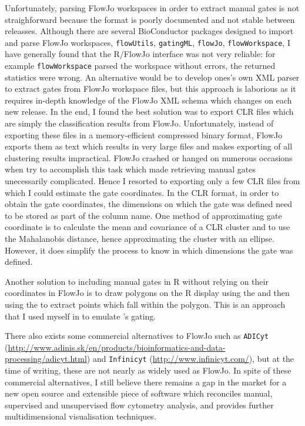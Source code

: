 Unfortunately, parsing FlowJo workspaces in order to extract manual gates is not straighforward because the format is poorly documented and not stable between releasses.
Although there are several BioConductor packages designed to import and parse FlowJo workspaces, \texttt{flowUtils}, \texttt{gatingML}, \texttt{flowJo}, \texttt{flowWorkspace}, I have generally found that the R/FlowJo interface was not very reliable: for example \texttt{flowWorkspace} parsed the workspace without errors, the returned statistics were wrong.
An alternative would be to develop ones's own XML parser to extract gates from FlowJo workspace files, but this approach is laborious as it requires in-depth knowledge of the FlowJo XML schema which changes on each new release.
In the end, I found the best solution was to export CLR files which are simply the classification results from FlowJo.
Unfortunately, instead of exporting these files in a memory-efficient compressed binary format, FlowJo exports them as text which results in very large files and makes exporting of all clustering results impractical. 
FlowJo crashed or hanged on numerous occasions when try to accomplish this task which made retrieving manual gates unecessarily complicated.
Hence I resorted to exporting only a few CLR files from which I could estimate the gate coordinates.
In the CLR format, in order to obtain the gate coordinates, the dimensions on which the gate was defined need to be stored as part of the column name.
One method of approximating gate coordinate is to calculate the mean and covariance of a CLR cluster and to use the Mahalanobis distance, hence approximating the cluster with an ellipse.
However, it does simplify the process to know in which dimensions the gate was defined.

Another solution to including manual gates in R without relying on their coordinates in FlowJo is to draw polygons on the R display using the  and then using the  to extract points which fall within the polygon.
This is an approach that I used myself in  to emulate 's gating.

There also exists some commercial alternatives to FlowJo  such as \texttt{ADICyt} (\url{http://www.adinis.sk/en/products/bioinformatics-and-data-processing/adicyt.html}) and \texttt{Infinicyt} (\url{http://www.infinicyt.com/}), but at the time of writing, these are not nearly as widely used as FlowJo.
In spite of these commercial alternatives, I still believe there remains a gap in the market for a new open source and extensible piece of software which reconciles manual, supervised and unsupervised flow cytometry analysis, and provides further multidimensional visualisation techniques.



